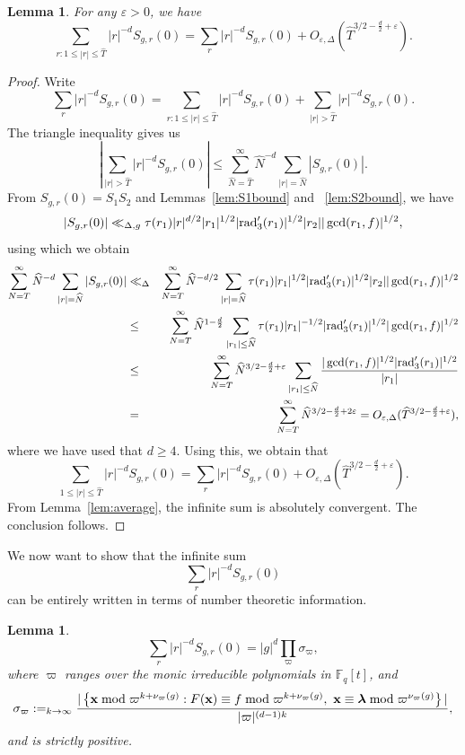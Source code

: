 \documentclass[11pt]{amsart}
\theoremstyle{plain}
\theoremstyle{plain}
\newtheorem{lemma}[theorem]{Lemma}
\renewcommand{\vec}[1]{\mathbf{#1}}
\theoremstyle{remark}
\theoremstyle{definition}
\let\lim=\relax
\DeclareMathOperator*{\lim}{lim}
\newcommand{\rad}{\textup{rad}'_3}
\renewcommand{\hat}{\widehat}
\begin{document}
\begin{lemma}\label{lem:estimate}For any $\varepsilon>0$, we have
\[\sum_{r:1\leq |r|\leq \hat{T}}|r|^{-d}S_{g,r}(0)=\sum_{r}|r|^{-d}S_{g,r}(0)+O_{\varepsilon,\Delta}(\hat{T}^{3/2-\frac{d}{2}+\varepsilon}).\]
\end{lemma}
\begin{proof}
Write 
\[\sum_{r}|r|^{-d}S_{g,r}(0)=\sum_{r:1\leq |r|\leq \hat{T}}|r|^{-d}S_{g,r}(0)+\sum_{|r|>\hat{T}}|r|^{-d}S_{g,r}(0).\]
The triangle inequality gives us
\[
\left|\sum_{|r|>\hat{T}}|r|^{-d}S_{g,r}(0)\right|\leq \sum_{\hat{N}=\hat{T}}^{\infty}\hat{N}^{-d}\sum_{|r|=\hat{N}}|S_{g,r}(0)|.
\]
From $S_{g,r}(0)=S_1S_2$ and Lemmas~\ref{lem:S1bound} and ~\ref{lem:S2bound}, we have
\[|S_{g,r}(0)|\ll_{\Delta,g} \tau(r_1)|r|^{d/2}|r_1|^{1/2}|\rad(r_1)|^{1/2}|r_2||\gcd(r_1,f)|^{1/2},\]
using which we obtain
\begin{eqnarray*}\sum_{N=T}^{\infty}\hat{N}^{-d}\sum_{|r|=\hat{N}}|S_{g,r}(0)|&\ll_{\Delta}& \sum_{N=T}^{\infty}\hat{N}^{-d/2}\sum_{|r|=\hat{N}} \tau(r_1)|r_1|^{1/2}|\rad(r_1)|^{1/2}|r_2||\gcd(r_1,f)|^{1/2}\\ &\leq & \sum_{N=T}^{\infty}\hat{N}^{1-\frac{d}{2}}\sum_{|r_1|\leq\hat{N}} \tau(r_1)|r_1|^{-1/2}|\rad(r_1)|^{1/2}|\gcd(r_1,f)|^{1/2}\\ &\leq & \sum_{N=T}^{\infty}\hat{N}^{3/2-\frac{d}{2}+\varepsilon}\sum_{|r_1|\leq\hat{N}}\frac{|\gcd(r_1,f)|^{1/2}|\rad(r_1)|^{1/2}}{|r_1|}\\ &=& \sum_{N=T}^{\infty}\hat{N}^{3/2-\frac{d}{2}+2\varepsilon}=O_{\varepsilon,\Delta}(\hat{T}^{3/2-\frac{d}{2}+\varepsilon}),
\end{eqnarray*}
where we have used that $d\geq 4$. Using this, we obtain that
\[\sum_{1\leq |r|\leq \hat{T}}|r|^{-d}S_{g,r}(0)=\sum_{r}|r|^{-d}S_{g,r}(0)+O_{\varepsilon,\Delta}(\hat{T}^{3/2-\frac{d}{2}+\varepsilon}).\]
From Lemma~\ref{lem:average}, the infinite sum is absolutely convergent. The conclusion follows.
\end{proof}
We now want to show that the infinite sum
\[\sum_{r}|r|^{-d}S_{g,r}(0)\]
can be entirely written in terms of number theoretic information.
\begin{lemma}\label{lem:densitysum} 
\[\sum_{r}|r|^{-d}S_{g,r}(0)=|g|^d\prod_{\varpi}\sigma_{\varpi},\]
where $\varpi$ ranges over the monic irreducible polynomials in $\mathbb{F}_q[t]$, and
\[\sigma_{\varpi}:=\lim_{k\rightarrow\infty}\frac{|\left\{\vec{x}\bmod \varpi^{k+\nu_\varpi(g)}:F(\vec{x})\equiv f\bmod\varpi^{k+\nu_\varpi(g)},\ \vec{x}\equiv\boldsymbol{\lambda}\bmod\varpi^{\nu_{\varpi}(g)}\right\}|}{|\varpi|^{(d-1)k}},\]
and is strictly positive.
\end{lemma}
\end{document}
